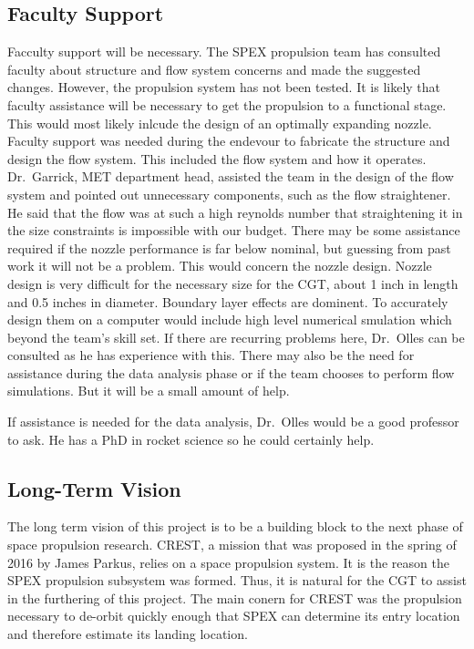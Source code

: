 \documentclass[conference]{IEEEtran} %
\begin{document}
\subsection{Faculty Support}
Facculty support will be necessary. The SPEX propulsion team has consulted faculty about structure and flow system concerns and made the suggested changes. However, the propulsion system
has not been tested. It is likely that faculty assistance will be necessary to get the propulsion to a functional stage. This would most likely inlcude the design of an optimally expanding
nozzle. Faculty support was needed during the endevour to fabricate the structure and design the flow system.
This included the flow system and how it operates. Dr.\ Garrick, MET department head, assisted the team in the design of the flow system and pointed out unnecessary components, such
as the flow straightener. He said that the flow was at such a high reynolds number that straightening it in the size constraints is impossible with our budget.
There may be some assistance required if the nozzle performance is far below nominal, but guessing from past work it will not be a problem. This would concern the nozzle design.
Nozzle design is very difficult for the necessary size for the CGT, about 1 inch in length and 0.5 inches in diameter. Boundary layer effects are dominent. To accurately design them
on a computer would include high level numerical smulation which beyond the team's skill set. If there are recurring problems here, Dr.\ Olles can be consulted as he has experience with this.
There may also be the need for assistance during the data analysis phase or if the team chooses to perform flow simulations. But it will be a small amount of help.

If assistance is needed for the data analysis, Dr.\ Olles would be a good professor to ask. He has a PhD in rocket science
so he could certainly help.
\subsection{Long-Term Vision}
\label{sec:vision}

The long term vision of this project is to be a building block to the next phase of space propulsion research. CREST, a mission that was proposed in the
spring of 2016 by James Parkus, relies on a space propulsion system. It is the reason the SPEX propulsion subsystem was formed. Thus, it is natural for the
CGT to assist in the furthering of this project. The main conern for CREST was the propulsion necessary to de-orbit quickly enough that SPEX can determine its entry location and therefore estimate its landing location.
\end{document}
